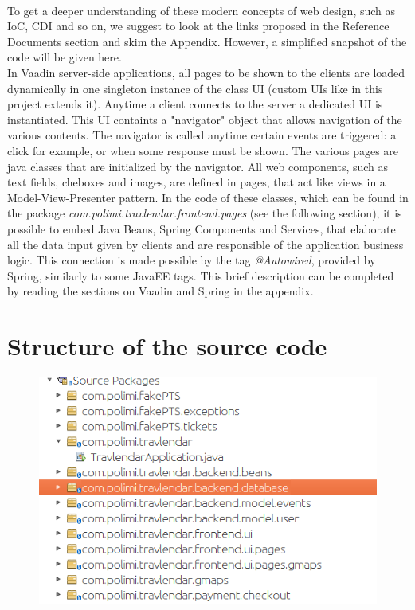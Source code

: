 \documentclass{article}
\begin{document}
\paragraph{}To get a deeper understanding of these modern concepts of web design, such as IoC, CDI and so on, we suggest to look at the links proposed in the Reference Documents section and skim the Appendix. However, a simplified snapshot of the code will be given here.\\
In Vaadin server-side applications, all pages to be shown to the clients are loaded dynamically in one singleton instance of the class UI (custom UIs like in this project extends it). Anytime a client connects to the server a dedicated UI is instantiated. This UI containts a "navigator" object that allows navigation of the various contents. The navigator is called anytime certain events are triggered: a click for example, or when some response must be shown. The various pages are java classes that are initialized by the navigator. All web components, such as text fields, cheboxes and images, are defined in pages, that act like views in a Model-View-Presenter pattern. In the code of these classes, which can be found in the package \textit{com.polimi.travlendar.frontend.pages} (see the following section), it is possible to embed Java Beans, Spring Components and Services, that elaborate all the data input given by clients and are responsible of the application business logic. This connection is made possible by the tag \textit{@Autowired}, provided by Spring, similarly to some JavaEE tags. This brief description can be completed by reading the sections on Vaadin and Spring in the appendix.
\newpage
	\section{Structure of the source code}
		\begin{figure}[H]
		\includegraphics[width=\linewidth]{Images/source_code_structure.png}
		\label{fig:Source Code}
		\end{figure}
\end{document}

